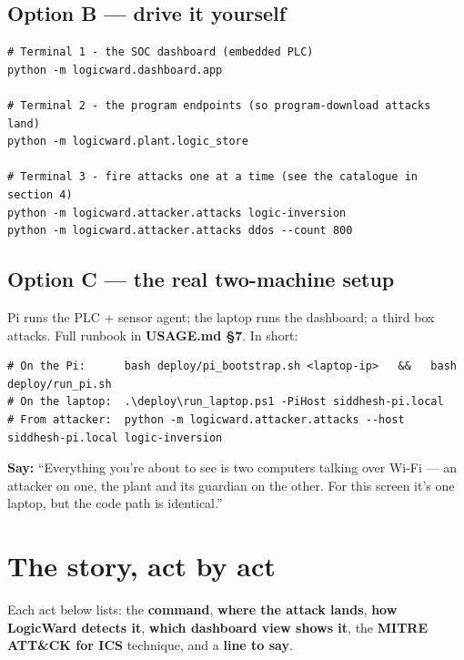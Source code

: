 \documentclass[11pt,a4paper]{article}
\begin{document}
\subsection{Option B --- drive it yourself}
\begin{lstlisting}
# Terminal 1 - the SOC dashboard (embedded PLC)
python -m logicward.dashboard.app

# Terminal 2 - the program endpoints (so program-download attacks land)
python -m logicward.plant.logic_store

# Terminal 3 - fire attacks one at a time (see the catalogue in section 4)
python -m logicward.attacker.attacks logic-inversion
python -m logicward.attacker.attacks ddos --count 800
\end{lstlisting}

\subsection{Option C --- the real two-machine setup}
Pi runs the PLC + sensor agent; the laptop runs the dashboard; a third box attacks.
Full runbook in \textbf{USAGE.md \S7}. In short:
\begin{lstlisting}
# On the Pi:      bash deploy/pi_bootstrap.sh <laptop-ip>   &&   bash deploy/run_pi.sh
# On the laptop:  .\deploy\run_laptop.ps1 -PiHost siddhesh-pi.local
# From attacker:  python -m logicward.attacker.attacks --host siddhesh-pi.local logic-inversion
\end{lstlisting}

\begin{say}
\textbf{Say:} ``Everything you're about to see is two computers talking over Wi-Fi --- an
attacker on one, the plant and its guardian on the other. For this screen it's one laptop,
but the code path is identical.''
\end{say}

\section{The story, act by act}

Each act below lists: the \textbf{command}, \textbf{where the attack lands}, \textbf{how
LogicWard detects it}, \textbf{which dashboard view shows it}, the \textbf{MITRE ATT\&CK
for ICS} technique, and a \textbf{line to say}.
\end{document}
